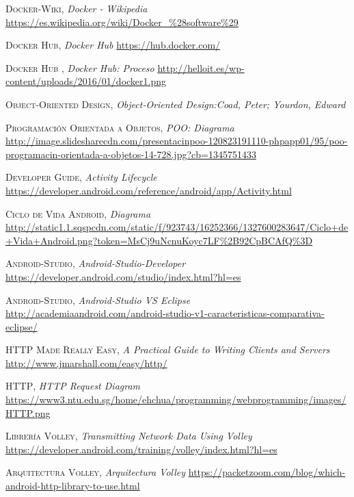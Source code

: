 \documentclass[a4paper,11pt]{book}
\begin{document}
\begin{thebibliography}{aaaa}
 \textsc{Docker-Wiki},
\textit{Docker - Wikipedia}
\url{https://es.wikipedia.org/wiki/Docker_\%28software\%29} 


 \textsc{Docker Hub},
\textit{Docker Hub}
\url{https://hub.docker.com/} 

 \textsc{Docker Hub },
\textit{Docker Hub: Proceso}
\url{http://helloit.es/wp-content/uploads/2016/01/docker1.png}









 \textsc{Object-Oriented Design},
\textit{Object-Oriented Design:Coad, Peter; Yourdon, Edward }
\url{} 

 \textsc{Programación Orientada a Objetos},
\textit{POO: Diagrama }
\url{http://image.slidesharecdn.com/presentacinpoo-120823191110-phpapp01/95/poo-programacin-orientada-a-objetos-14-728.jpg?cb=1345751433} 

 \textsc{Developer Guide},
\textit{Activity Lifecycle }
\url{https://developer.android.com/reference/android/app/Activity.html} 


 \textsc{Ciclo de Vida Android},
\textit{Diagrama}
\url{http://static1.1.sqspcdn.com/static/f/923743/16252366/1327600283647/Ciclo+de+Vida+Android.png?token=MsCj9uNcnuKoyc7LF%2B92CpBCAfQ%3D} 

 \textsc{Android-Studio},
\textit{Android-Studio-Developer}
\url{https://developer.android.com/studio/index.html?hl=es} 

 \textsc{Android-Studio},
\textit{Android-Studio VS Eclipse}
\url{http://academiaandroid.com/android-studio-v1-caracteristicas-comparativa-eclipse/} 


 \textsc{HTTP Made Really Easy},
\textit{A Practical Guide to Writing Clients and Servers}
\url{http://www.jmarshall.com/easy/http/} 


 \textsc{HTTP},
\textit{HTTP Request Diagram}
\url{https://www3.ntu.edu.sg/home/ehchua/programming/webprogramming/images/HTTP.png} 


 \textsc{Librería Volley},
\textit{Transmitting Network Data Using Volley}
\url{https://developer.android.com/training/volley/index.html?hl=es}

 \textsc{Arquitectura Volley},
\textit{Arquitectura Volley}
\url{https://packetzoom.com/blog/which-android-http-library-to-use.html}


\end{thebibliography}
\end{document}
